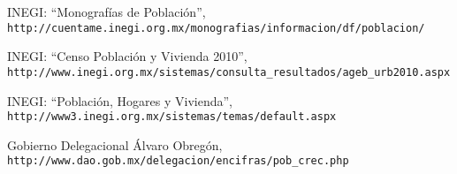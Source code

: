 \documentclass{article}
\begin{document}
\begin{thebibliography}{0}

  INEGI: ``Monografías de Población'',\\
  \verb!http://cuentame.inegi.org.mx/monografias/informacion/df/poblacion/!
  

INEGI: ``Censo Población y Vivienda 2010'',\\ 
  \verb!http://www.inegi.org.mx/sistemas/consulta_resultados/ageb_urb2010.aspx!

  INEGI: ``Población, Hogares y Vivienda'',\\
  \verb!http://www3.inegi.org.mx/sistemas/temas/default.aspx!

  Gobierno Delegacional Álvaro Obregón,\\
  \verb!http://www.dao.gob.mx/delegacion/encifras/pob_crec.php!
  
  
\end{thebibliography}
\end{document}
